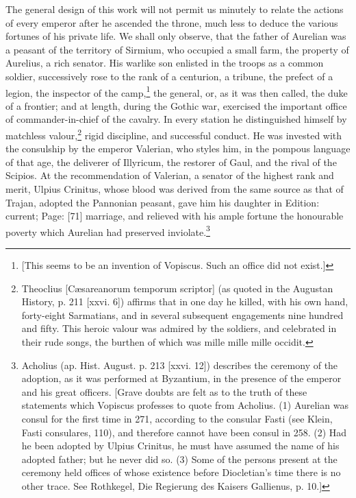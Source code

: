The general design of this work will not permit us minutely to relate the actions of every emperor after he ascended the throne, much less to deduce the various fortunes of his private life. We shall only observe, that the father of Aurelian was a peasant of the territory of Sirmium, who occupied a small farm, the property of Aurelius, a rich senator. His warlike son enlisted in the troops as a common soldier, successively rose to the rank of a centurion, a tribune, the prefect of a legion, the inspector of the camp,\footnote{[This seems to be an invention of Vopiscus. Such an office did not exist.]} the general, or, as it was then called, the duke of a frontier; and at length, during the Gothic war, exercised the important office of commander-in-chief of the cavalry. In every station he distinguished himself by matchless valour,\footnote{Theoclius [Cæsareanorum temporum scriptor] (as quoted in the Augustan History, p. 211 [xxvi. 6]) affirms that in one day he killed, with his own hand, forty-eight Sarmatians, and in several subsequent engagements nine hundred and fifty. This heroic valour was admired by the soldiers, and celebrated in their rude songs, the burthen of which was mille mille mille occidit.} rigid discipline, and successful conduct. He was invested with the consulship by the emperor Valerian, who styles him, in the pompous language of that age, the deliverer of Illyricum, the restorer of Gaul, and the rival of the Scipios. At the recommendation of Valerian, a senator of the highest rank and merit, Ulpius Crinitus, whose blood was derived from the same source as that of Trajan, adopted the Pannonian peasant, gave him his daughter in Edition: current; Page: [71] marriage, and relieved with his ample fortune the honourable poverty which Aurelian had preserved inviolate.\footnote{Acholius (ap. Hist. August. p. 213 [xxvi. 12]) describes the ceremony of the adoption, as it was performed at Byzantium, in the presence of the emperor and his great officers. [Grave doubts are felt as to the truth of these statements which Vopiscus professes to quote from Acholius. (1) Aurelian was consul for the first time in 271, according to the consular Fasti (see Klein, Fasti consulares, 110), and therefore cannot have been consul in 258. (2) Had he been adopted by Ulpius Crinitus, he must have assumed the name of his adopted father; but he never did so. (3) Some of the persons present at the ceremony held offices of whose existence before Diocletian\texthebrew{}’s time there is no other trace. See Rothkegel, Die Regierung des Kaisers Gallienus, p. 10.]}

